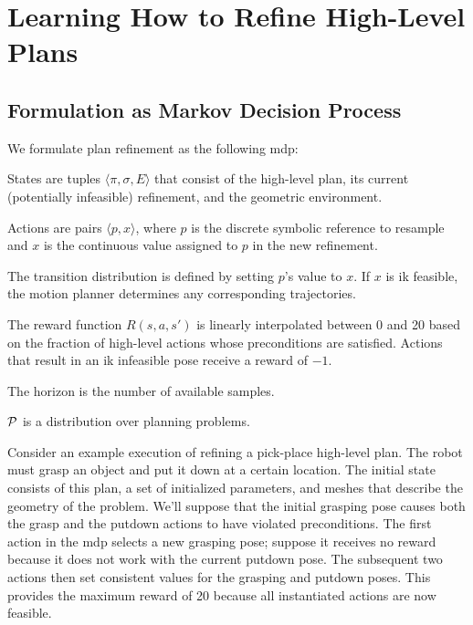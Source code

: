 \section{Learning How to Refine High-Level Plans}

\subsection{Formulation as Markov Decision Process}
We formulate plan refinement as the following {\sc mdp}:
\begin{tightlist}
\item States are tuples $\langle \pi, \sigma, E \rangle$ that consist of the
high-level plan, its current (potentially infeasible) refinement, and the
geometric environment.
\item Actions are pairs $\langle p, x \rangle$, where $p$ is the discrete symbolic
reference to resample and $x$ is the continuous value assigned to $p$ in the new refinement.
\item The transition distribution is defined by setting $p$'s value
  to $x$. If $x$ is {\sc ik} feasible, the motion planner determines
  any corresponding trajectories.
\item The reward function $R(s, a, s')$ is linearly interpolated
  between 0 and 20 based on the fraction of high-level actions whose
  preconditions are satisfied. Actions that result in an {\sc ik}
  infeasible pose receive a reward of $-1$.
\item The horizon is the number of available samples.
\item $\mathcal{P}$ is a distribution over planning problems.
\end{tightlist}

Consider an example execution of refining a pick-place high-level plan. The
robot must grasp an object and put it down at a certain location. The
initial state consists of this plan, a set of initialized parameters,
and meshes that describe the geometry of the problem. We'll suppose
that the initial grasping pose causes both the grasp and the putdown
actions to have violated preconditions. The first action in the {\sc mdp} selects a new grasping pose;
suppose it receives no reward because it does not work with the current putdown pose. The subsequent
two actions then set consistent values for the grasping and putdown poses. This provides
the maximum reward of 20 because all instantiated actions are now feasible.

